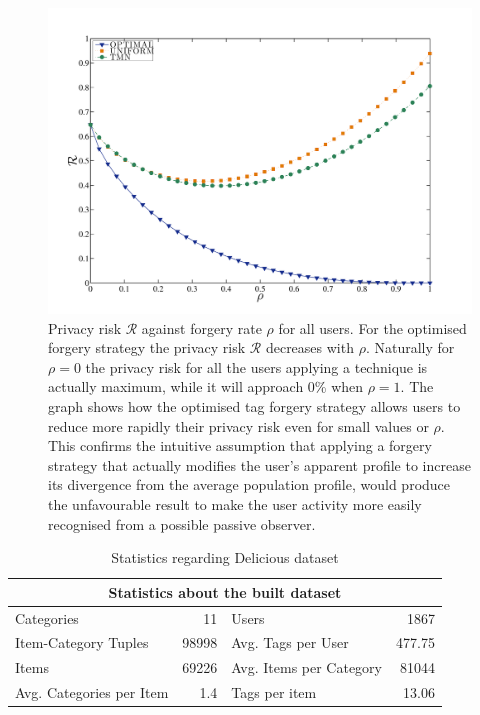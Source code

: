 \begin{figure}[htb]  
\includegraphics[width=\textwidth]{figures/Fig4a.pdf}
\caption[Privacy Risk for all users.]{Privacy risk $\mathcal{R}$ against forgery rate $\rho$ for all users. For the optimised forgery strategy the privacy risk $\mathcal{R}$ decreases with $\rho$. Naturally for $\rho = 0$ the privacy risk for all the users applying a technique is actually maximum, while it will approach 0\% when $\rho = 1 $. The graph shows how the optimised tag forgery strategy allows users to reduce more rapidly their privacy risk even for small values or $ \rho $. This confirms the intuitive assumption that applying a forgery strategy that actually modifies the user's apparent profile to increase its divergence from the average population profile, would produce the unfavourable result to make the user activity more easily recognised from a possible passive observer.
\label{fig:Risk-Rho}}
\end{figure}

\begin{table}[htbp]
\centering
\caption{Statistics regarding Delicious dataset}
\def\arraystretch{2.5}
\begin{tabular}{| l | r | l | r | }
\hline
\multicolumn{4}{|c|}{Statistics about the built dataset}            \\[2.5mm] \hline
Categories               & 11    & Users                   & 1867   \\[2.5mm] \hline
Item-Category Tuples     & 98998 & Avg. Tags per User      & 477.75 \\[2.5mm] \hline
Items                    & 69226 & Avg. Items per Category & 81044  \\[2.5mm]\hline
Avg. Categories per Item & 1.4   & Tags per item           & 13.06  \\[2.5mm]\hline
\end{tabular}
\label{table:DatasetStats}
\end{table}

